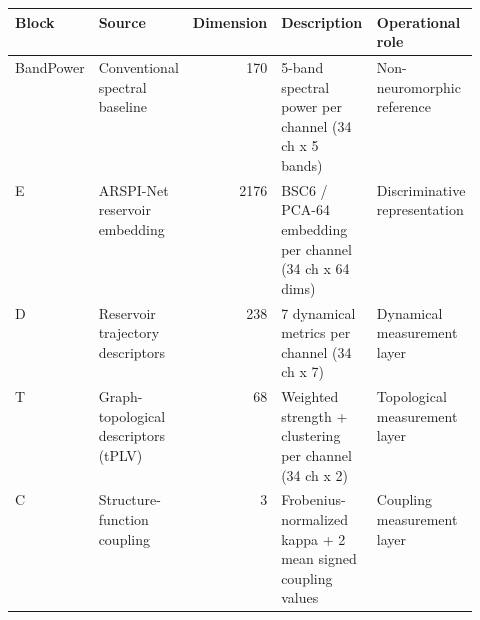 \begin{tabular}{llrp{0.32\linewidth}p{0.22\linewidth}}
\hline
Block & Source & Dimension & Description & Operational role \\
\hline
BandPower & Conventional spectral baseline & 170 & 5-band spectral power per channel (34 ch x 5 bands) & Non-neuromorphic reference \\
E & ARSPI-Net reservoir embedding & 2176 & BSC6 / PCA-64 embedding per channel (34 ch x 64 dims) & Discriminative representation \\
D & Reservoir trajectory descriptors & 238 & 7 dynamical metrics per channel (34 ch x 7) & Dynamical measurement layer \\
T & Graph-topological descriptors (tPLV) & 68 & Weighted strength + clustering per channel (34 ch x 2) & Topological measurement layer \\
C & Structure-function coupling & 3 & Frobenius-normalized kappa + 2 mean signed coupling values & Coupling measurement layer \\
\hline
\end{tabular}
